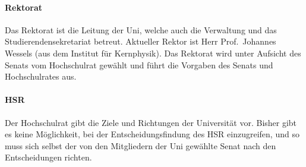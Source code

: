 \begin{multicols*}{2}
\paragraph{Rektorat}
Das Rektorat ist die Leitung der Uni, welche auch die Verwaltung und das Studierendensekretariat betreut.
Aktueller Rektor ist Herr Prof.\ Johannes Wessels (aus dem Institut für Kernphysik).
Das Rektorat wird unter Aufsicht des Senats vom Hochschulrat gewählt und führt die Vorgaben des Senats und Hochschulrates aus.


\paragraph{HSR}
Der Hochschulrat gibt die Ziele und Richtungen der Universität vor.
Bisher gibt es keine Möglichkeit, bei der Entscheidungsfindung des HSR einzugreifen, und so muss sich selbst der von den Mitgliedern der Uni gewählte Senat nach den Entscheidungen richten.


\end{multicols*}


